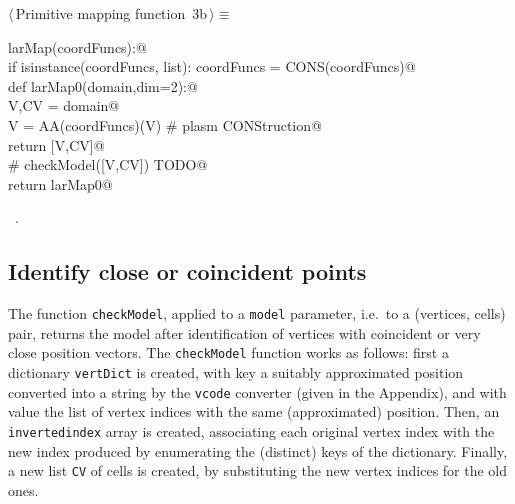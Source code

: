 \documentclass[11pt,oneside]{article}	%
\begin{document}
\begin{flushleft} \small \label{scrap3}
\protect{}$\langle\,$Primitive mapping function\nobreak\ {\footnotesize 3b}$\,\rangle\equiv$
\vspace{-1ex}
\begin{list}{}{} \item
\mbox{}\verb@def larMap(coordFuncs):@\\
\mbox{}\verb@   if isinstance(coordFuncs, list): coordFuncs = CONS(coordFuncs)@\\
\mbox{}\verb@   def larMap0(domain,dim=2):@\\
\mbox{}\verb@      V,CV = domain@\\
\mbox{}\verb@      V = AA(coordFuncs)(V)  # plasm CONStruction@\\
\mbox{}\verb@      return [V,CV]@\\
\mbox{}\verb@      # checkModel([V,CV])  TODO@\\
\mbox{}\verb@   return larMap0@\\
\mbox{}\verb@@{\NWsep}
\end{list}
\vspace{-1ex}
\footnotesize\addtolength{\baselineskip}{-1ex}
\begin{list}{}{\setlength{\itemsep}{-\parsep}\setlength{\itemindent}{-\leftmargin}}
\item \NWtxtMacroRefIn\ .
\end{list}
\end{flushleft}

\subsection{Identify close or coincident points}

The function \texttt{checkModel}, applied to a \texttt{model} parameter, i.e.~to a (vertices, cells)  pair, returns the model after identification of vertices with coincident or very close position vectors.
The \texttt{checkModel} function works as follows: first a dictionary \texttt{vertDict} is created, with key a suitably approximated position converted into a string by the \texttt{vcode} converter (given in the Appendix), and with value the list of vertex indices with the same (approximated) position. Then, an \texttt{invertedindex} array is created, associating each original vertex index with the new index produced by enumerating the (distinct) keys of the dictionary. Finally, a new list \texttt{CV} of cells is created, by substituting the new vertex indices for the old ones. 
\end{document}
